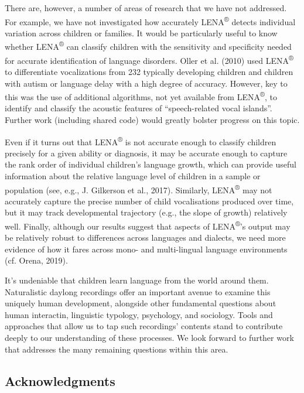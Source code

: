 \documentclass[english,floatsintext,man]{apa6}
\begin{document}
There are, however, a number of areas of research that we have not
addressed. For example, we have not investigated how accurately
LENA\textsuperscript{®} detects individual variation across children or
families. It would be particularly useful to know whether
LENA\textsuperscript{®} can classify children with the sensitivity and
specificity needed for accurate identification of language disorders.
Oller et al. (2010) used LENA\textsuperscript{®} to differentiate
vocalizations from 232 typically developing children and children with
autism or language delay with a high degree of accuracy. However, key to
this was the use of additional algorithms, not yet available from
LENA\textsuperscript{®}, to identify and classify the acoustic features
of \enquote{speech-related vocal islands}. Further work (including
shared code) would greatly bolster progress on this topic.

Even if it turns out that LENA\textsuperscript{®} is not accurate enough
to classify children precisely for a given ability or diagnosis, it may
be accurate enough to capture the rank order of individual children's
language growth, which can provide useful information about the relative
language level of children in a sample or population (see, e.g., J.
Gilkerson et al., 2017). Similarly, LENA\textsuperscript{®} may not
accurately capture the precise number of child vocalisations produced
over time, but it may track developmental trajectory (e.g., the slope of
growth) relatively well. Finally, although our results suggest that
aspects of LENA\textsuperscript{®}'s output may be relatively robust to
differences across languages and dialects, we need more evidence of how
it fares across mono- and multi-lingual language environments (cf.
Orena, 2019).

It's undeniable that children learn language from the world around them.
Naturalistic daylong recordings offer an important avenue to examine
this uniquely human development, alongside other fundamental questions
about human interactin, linguistic typology, psychology, and sociology.
Tools and approaches that allow us to tap such recordings' contents
stand to contribute deeply to our understanding of these processes. We
look forward to further work that addresses the many remaining questions
within this area.

\subsection{Acknowledgments}\label{acknowledgments}
\end{document}
